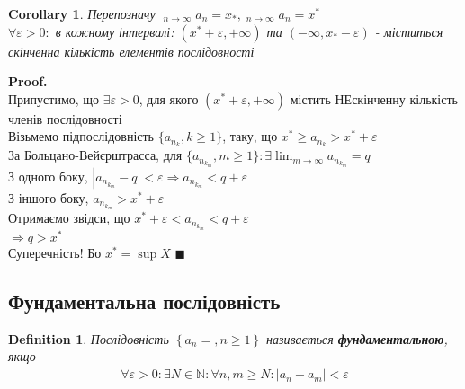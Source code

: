 \documentclass[a4paper, 14pt]{extarticle}
\DeclareMathOperator*\uplim{\overline{lim}}
\DeclareMathOperator*\downlim{\underline{lim}}
\def\huge{\displaystyle}
\newcommand{\sequence}[2][{}]{%
\ifthenelse{\equal{#1}{}}{$\{{#2}, n \geq 1 \}$}
{$\huge \left\{ {#2} = {#1}, n \geq 1 \right\}$}%
}
\theoremstyle{theoremdd}
\theoremstyle{theoremdd}
\newtheorem{definition}[theorem]{Definition}
\theoremstyle{theoremdd}
\theoremstyle{theoremdd}
\theoremstyle{theoremdd}
\theoremstyle{theoremdd}
\theoremstyle{theoremdd}
\theoremstyle{theoremdd}
\newtheorem{corollary}[theorem]{Corollary}
\newenvironment{pf}{\vspace*{-3mm} \textbf{Proof. \\}}{$\blacksquare$}
\begin{document}
	\begin{corollary} Перепозначу $\displaystyle \downlim_{n \to \infty} a_n = x_*, \uplim_{n \to \infty} a_n = x^*$\\
	$\forall \varepsilon>0:$ в кожному інтервалі: $(x^*+\varepsilon, +\infty)$ та $(-\infty, x_*-\varepsilon)$ - міститься скінченна кількість елементів послідовності
	\end{corollary}
	\begin{pf}
	Припустимо, що $\exists \varepsilon > 0$, для якого $(x^*+\varepsilon, +\infty)$ містить НЕскінченну кількість членів послідовності\\
	Візьмемо підпослідовність $\{a_{n_k}, k \geq 1\}$, таку, що $x^* \geq a_{n_k} > x^* + \varepsilon$\\
	За Больцано-Вейєрштрасса, для $\{a_{n_{k_m}}, m \geq 1\}: \exists \huge \lim_{m \to \infty} a_{n_{k_m}} = q$\\
	З одного боку, $|a_{n_{k_m}} - q | < \varepsilon \Rightarrow a_{n_{k_m}} < q + \varepsilon$\\
	З іншого боку, $a_{n_{k_m}} > x^* + \varepsilon$\\
	Отримаємо звідси, що $x^* + \varepsilon < a_{n_{k_m}} < q + \varepsilon$\\
	$\Rightarrow q > x^*$\\
	Суперечність! Бо $x^* = \sup X$
	\end{pf}
	
	\subsection{Фундаментальна послідовність}
	\begin{definition}
	Послідовність \sequence{a_n} називається \textbf{фундаментальною}, якщо
	\begin{align*}
	\forall \varepsilon > 0: \exists N \in \mathbb{N}: \forall n,m \geq N: |a_n - a_m| < \varepsilon
	\end{align*}
	\end{definition}
	
\end{document}
